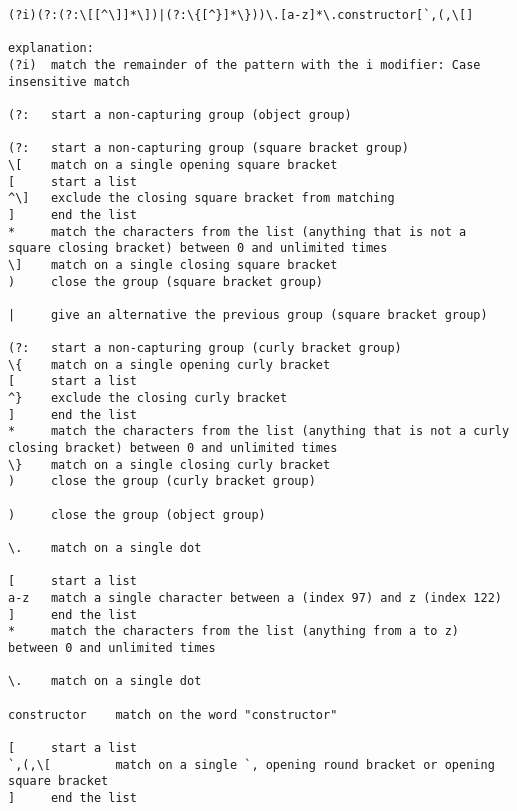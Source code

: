 \begin{lstlisting}[style=basicStyle, caption=regex of proposed rule id:2, label={lst:constructorsruleproposalregexA}]
(?i)(?:(?:\[[^\]]*\])|(?:\{[^}]*\}))\.[a-z]*\.constructor[`,(,\[]

explanation:
(?i)  match the remainder of the pattern with the i modifier: Case insensitive match

(?:   start a non-capturing group (object group)

(?:   start a non-capturing group (square bracket group)
\[    match on a single opening square bracket
[     start a list
^\]   exclude the closing square bracket from matching
]     end the list
*     match the characters from the list (anything that is not a square closing bracket) between 0 and unlimited times
\]    match on a single closing square bracket
)     close the group (square bracket group)

|     give an alternative the previous group (square bracket group)

(?:	  start a non-capturing group (curly bracket group)
\{	  match on a single opening curly bracket
[     start a list
^}	  exclude the closing curly bracket
]     end the list
*     match the characters from the list (anything that is not a curly closing bracket) between 0 and unlimited times
\}	  match on a single closing curly bracket
)     close the group (curly bracket group)

)     close the group (object group)

\.    match on a single dot

[     start a list
a-z   match a single character between a (index 97) and z (index 122)
]     end the list
*     match the characters from the list (anything from a to z) between 0 and unlimited times

\.	  match on a single dot

constructor    match on the word "constructor"

[     start a list
`,(,\[         match on a single `, opening round bracket or opening square bracket
]     end the list
\end{lstlisting}



